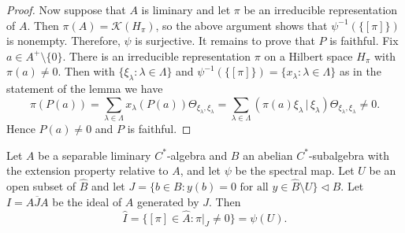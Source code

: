 \documentclass[12pt,a4paper]{amsart}
\newcommand{\Kk}{\mathcal{K}}
\newcommand{\Hh}{{H}}
\begin{document}
\begin{proof}
Now suppose that $A$ is liminary and let $\pi$ be an irreducible
representation of $A$.  Then $\pi(A)=\Kk(H_\pi)$, so the above
argument shows that $\psi^{-1}(\{[\pi]\})$ is nonempty.
Therefore, $\psi$ is surjective. It remains to prove that $P$ is
faithful.  Fix $a \in A^+ \setminus \{0\}$. There is an
irreducible representation $\pi$ on a Hilbert space $\Hh_\pi$
with $\pi(a) \ne 0$.   Then with $\{\xi_\lambda : \lambda \in
\Lambda\}$ and $\psi^{-1}(\{[\pi]\}) = \{x_\lambda : \lambda \in
\Lambda\}$ as in the statement of the lemma we have
\[
\pi(P(a)) =  \sum_{\lambda \in \Lambda} x_\lambda(P(a)) \Theta_{\xi_\lambda,\xi_\lambda}
=  \sum_{\lambda \in \Lambda} (\pi(a) \xi_\lambda\,|\, \xi_\lambda)
                                \Theta_{\xi_\lambda,\xi_\lambda} \ne 0.
\]
Hence $P(a) \ne 0$ and $P$ is faithful.
\end{proof}

\begin{lemma}\label{lem-claim1}
Let $A$ be a separable liminary $C^*$-algebra and $B$ an
abelian $C^*$-subalgebra with the  extension property relative
to $A$, and let $\psi$ be the spectral map. Let $U$ be an open
subset of $\widehat B$ and let $J = \{b\in B: y(b)=0\text{\ for
all\ }y\in\widehat B\setminus U\} \lhd B$. Let $I =
\overline{AJA}$ be the ideal of $A$ generated by $J$. Then
\begin{equation}\label{eq-open}
\widehat I=\{[\pi]\in\widehat A:\pi|_J\neq 0\}=\psi(U).
\end{equation}
\end{lemma}
\end{document}
